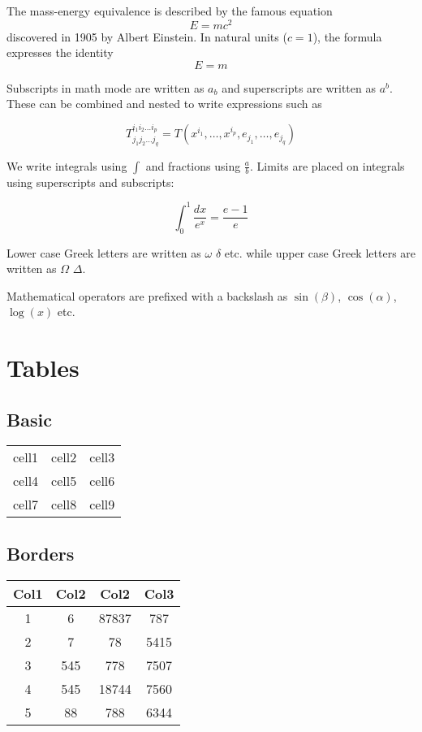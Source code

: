 \documentclass[12pt, letterpaper]{article}
\begin{document}
The mass-energy equivalence is described by the famous equation
\[ E=mc^2 \]
discovered in 1905 by Albert Einstein. 
In natural units ($c = 1$), the formula expresses the identity
\begin{equation}
E=m
\end{equation}

Subscripts in math mode are written as $a_b$ and superscripts are written as $a^b$. These can be combined and nested to write expressions such as

\[ T^{i_1 i_2 \dots i_p}_{j_1 j_2 \dots j_q} = T(x^{i_1},\dots,x^{i_p},e_{j_1},\dots,e_{j_q}) \]
 
We write integrals using $\int$ and fractions using $\frac{a}{b}$. Limits are placed on integrals using superscripts and subscripts:

\[ \int_0^1 \frac{dx}{e^x} =  \frac{e-1}{e} \]

Lower case Greek letters are written as $\omega$ $\delta$ etc. while upper case Greek letters are written as $\Omega$ $\Delta$.

Mathematical operators are prefixed with a backslash as $\sin(\beta)$, $\cos(\alpha)$, $\log(x)$ etc.

\section{Tables}

\subsection{Basic}

\begin{center}
  \begin{tabular}{ c c c }
    cell1 & cell2 & cell3 \\
    cell4 & cell5 & cell6 \\
    cell7 & cell8 & cell9
  \end{tabular}
\end{center}

\subsection{Borders}

\begin{center}
  \begin{tabular}{||c c c c||}
    \hline
    Col1 & Col2 & Col2  & Col3 \\ [0.5ex]
    \hline\hline
    1    & 6    & 87837 & 787  \\
    \hline
    2    & 7    & 78    & 5415 \\
    \hline
    3    & 545  & 778   & 7507 \\
    \hline
    4    & 545  & 18744 & 7560 \\
    \hline
    5    & 88   & 788   & 6344 \\ [1ex]
    \hline
  \end{tabular}
\end{center}
\end{document}
